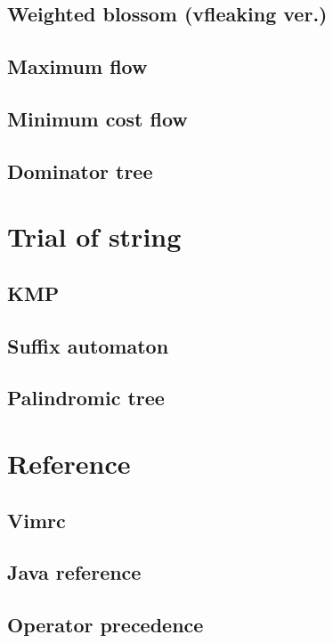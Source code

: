 \documentclass[UTF8,a4paper]{report}
\begin{document}
		\section{Weighted blossom (vfleaking ver.)}	
			
		\section{Maximum flow}
			
		\section{Minimum cost flow}
			
		\section{Dominator tree}
			
	\chapter{Trial of string}
		\section{KMP}
			
		\section{Suffix automaton}
			
		\section{Palindromic tree}
			
	\chapter{Reference}
		\section{Vimrc}
			
		\section{Java reference}
			
		\section{Operator precedence}
			
\end{document}
